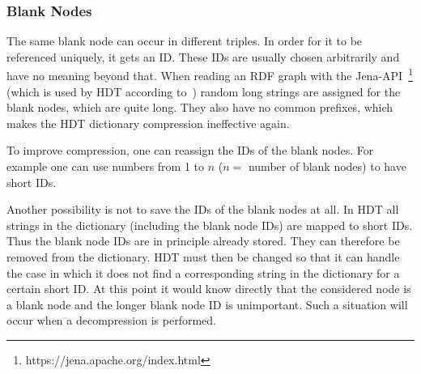 \subsubsection{Blank Nodes}\label{sec:approachBlankNodes}

The same blank node can occur in different triples. In order for it to be referenced uniquely, it gets an ID. These IDs are usually chosen arbitrarily and have no meaning beyond that. When reading an RDF graph with the Jena-API~\footnote{\label{foot:5}https://jena.apache.org/index.html} (which is used by HDT according to~\cite{hdt}) random long strings are assigned for the blank nodes, which are quite long. They also have no common prefixes, which makes the HDT dictionary compression ineffective again. 

To improve compression, one can reassign the IDs of the blank nodes. For example one can use numbers from 1 to $n$ ($n=$ number of blank nodes) to have short IDs. 

Another possibility is not to save the IDs of the blank nodes at all. In HDT all strings in the dictionary (including the blank node IDs) are mapped to short IDs. Thus the blank node IDs are in principle already stored. They can therefore be removed from the dictionary. HDT must then be changed so that it can handle the case in which it does not find a corresponding string in the dictionary for a certain short ID. At this point it would know directly that the considered node is a blank node and the longer blank node ID is unimportant. Such a situation will occur when a decompression is performed.
















